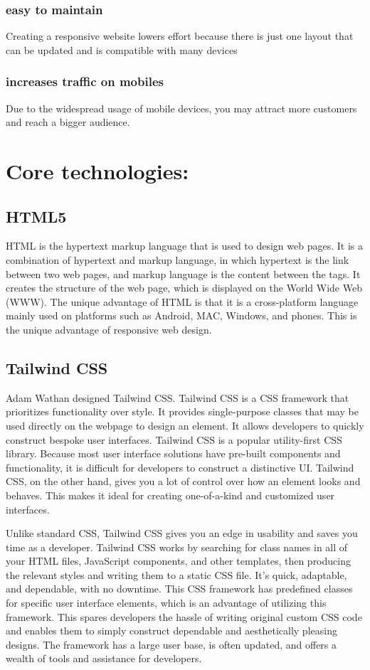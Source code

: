 \documentclass[conference]{IEEEtran}
\begin{document}
\subsubsection{\textbf{easy to maintain}} Creating a responsive website lowers effort because there is just one layout that can be updated and is compatible with many devices

\subsubsection{\textbf{increases traffic on mobiles}}Due to the widespread usage of mobile devices, you may attract more customers and reach a bigger audience.

\section{Core technologies:}

\subsection{HTML5}   HTML is the hypertext markup language that is used to design web pages. It is a combination of hypertext and markup language, in which hypertext is the link between two web pages, and markup language is the content between the tags. It creates the structure of the web page, which is displayed on the World Wide Web (WWW). The unique advantage of HTML is that it is a cross-platform language mainly used on platforms such as Android, MAC, Windows, and phones. This is the unique advantage of responsive web design.

\subsection{Tailwind CSS}\label{AA}
Adam Wathan designed Tailwind CSS. Tailwind CSS is a CSS framework that prioritizes functionality over style. It provides single-purpose classes that may be used directly on the webpage to design an element. It allows developers to quickly construct bespoke user interfaces. Tailwind CSS is a popular utility-first CSS library. Because most user interface solutions have pre-built components and functionality, it is difficult for developers to construct a distinctive UI. Tailwind CSS, on the other hand, gives you a lot of control over how an element looks and behaves. This makes it ideal for creating one-of-a-kind and customized user interfaces.

Unlike standard CSS, Tailwind CSS gives you an edge in usability and saves you time as a developer. Tailwind CSS works by searching for class names in all of your HTML files, JavaScript components, and other templates, then producing the relevant styles and writing them to a static CSS file. It's quick, adaptable, and dependable, with no downtime. This CSS framework has predefined classes for specific user interface elements, which is an advantage of utilizing this framework. This spares developers the hassle of writing original custom CSS code and enables them to simply construct dependable and aesthetically pleasing designs. The framework has a large user base, is often updated, and offers a wealth of tools and assistance for developers.
\end{document}
